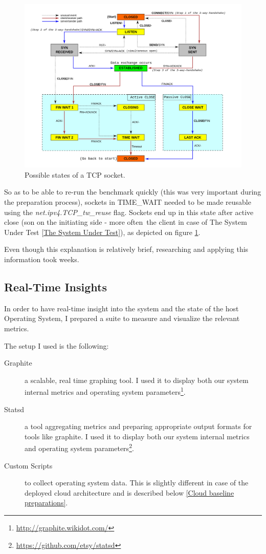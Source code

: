 \documentclass{uvamscse}
\begin{document}
\begin{figure}[H]
\centering
\includegraphics[scale=0.2]{TCPstates}
\caption{Possible states of a TCP socket.}
\label{figure:TCPstates}
\end{figure}

So as to be able to re-run the benchmark quickly (this was very important during the preparation process), sockets in TIME\_WAIT needed to be made reusable using the \textit{net.ipv4.TCP\_tw\_reuse} flag. Sockets end up in this state after active close (son on the initiating side - more often the client in case of The System Under Test \ref{The System Under Test}), as depicted on figure \ref{figure:TCPstates}.

Even though this explanation is relatively brief, researching and applying this information took weeks.

\subsection{Real-Time Insights}

In order to have real-time insight into the system and the state of the host Operating System, I prepared a suite to measure and visualize the relevant metrics.

The setup I used is the following:
\begin{description}
  \item[Graphite] a scalable, real time graphing tool. I used it to display both our system internal metrics and operating system parameters\footnote{\url{http://graphite.wikidot.com/}}.
  \item[Statsd] a tool aggregating metrics and preparing appropriate output formats for tools like graphite. I used it to display both our system internal metrics and operating system parameters\footnote{\url{https://github.com/etsy/statsd}}.
  \item[Custom Scripts] to collect operating system data. This is slightly different in case of the deployed cloud architecture and is described below \ref{Cloud baseline preparations}.
\end{description}
\end{document}
